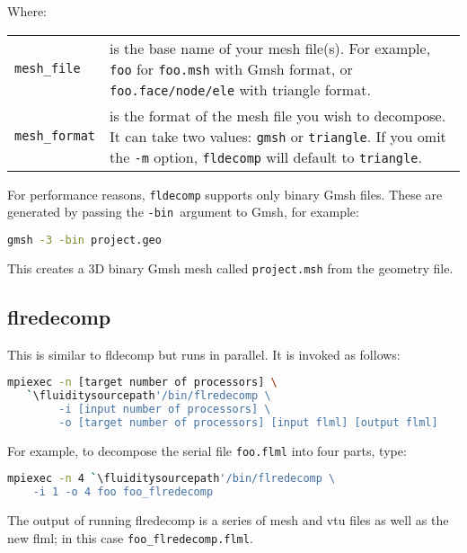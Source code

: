 Where:
\begin{center}
  \begin{tabular}{lp{}}
    \lstinline+mesh_file+ & is the base name of your mesh file(s). For
    example, \lstinline+foo+ for \lstinline+foo.msh+ with Gmsh format, or
    \lstinline+foo.face/node/ele+ with triangle format.\\
    \lstinline+mesh_format+ & is the format of the mesh file you wish to
    decompose. It can take two values: \lstinline+gmsh+ or
    \lstinline+triangle+. If you omit the \lstinline+-m+ option,
    \lstinline+fldecomp+ will default to \lstinline+triangle+.
  \end{tabular}
\end{center}

For performance reasons, \lstinline[language=Bash]{fldecomp} supports only
binary Gmsh files. These are generated by passing the \lstinline{-bin}\
argument to Gmsh, for example:

\begin{lstlisting}[language=bash]
gmsh -3 -bin project.geo
\end{lstlisting}

This creates a 3D binary Gmsh mesh called \lstinline{project.msh} from the geometry file.



\subsection{flredecomp}
\label{mesh!meshing tools!flredecomp}
This is similar to fldecomp but runs in parallel. It is invoked as follows:
\begin{lstlisting}[language=bash]
mpiexec -n [target number of processors] \
   `\fluiditysourcepath'/bin/flredecomp \
        -i [input number of processors] \
        -o [target number of processors] [input flml] [output flml]
\end{lstlisting}

For example, to decompose the serial file \lstinline+foo.flml+
into four parts, type:

\begin{lstlisting}[language=bash]
mpiexec -n 4 `\fluiditysourcepath'/bin/flredecomp \
    -i 1 -o 4 foo foo_flredecomp
\end{lstlisting}

The output of running flredecomp is a series of mesh and vtu files as well
as the new flml; in this case \lstinline+foo_flredecomp.flml+.

